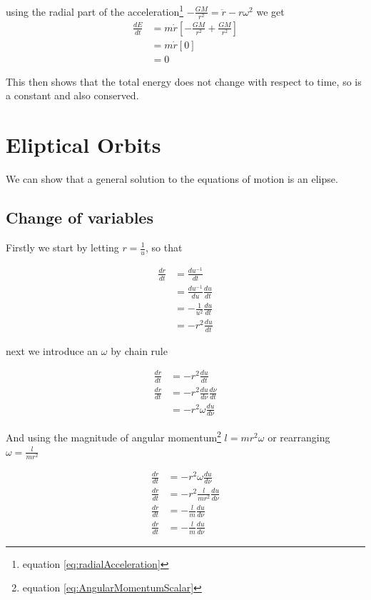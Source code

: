 using the radial part of the acceleration\footnote{equation \ref{eq:radialAcceleration}} $-\frac{GM}{r^2}= \ddot{r} -r \omega^2$ we get
\begin{align}
\frac{dE}{dt}&=m \dot{r}\left[-\frac{GM}{r^2}+\frac{GM}{r^2}\right] \nonumber \\
&=m \dot{r}\left[0\right] \nonumber \\
&=0
\end{align}

This then shows that the total energy does not change with respect to time, so is a constant and also conserved.

\section{Eliptical Orbits}
We can show that a general solution to the equations of motion is an elipse.

\subsection{Change of variables}
Firstly we start by letting $r=\frac{1}{u}$, so that

\begin{align}
\frac{dr}{dt} &= \frac{du^{-1}}{dt}\nonumber \\
&= \frac{du^{-1}}{du}\frac{du}{dt}\nonumber \\
&= -\frac{1}{u^2}\frac{du}{dt}\nonumber \\
&= -r^2\frac{du}{dt}
\end{align}

next we introduce an $\omega$ by chain rule

\begin{align}
\frac{dr}{dt}
&= -r^2\frac{du}{dt}\nonumber \\
\frac{dr}{dt} &= -r^2\frac{du}{d\nu}\frac{d\nu}{dt} \nonumber \\
&= -r^2\omega\frac{du}{d\nu} \nonumber
\end{align}

And using the magnitude of angular momentum\footnote{equation \ref{eq:AngularMomentumScalar}} $l=mr^2\omega$ or rearranging $\omega = \frac{l}{mr^2}$

\begin{align}
\frac{dr}{dt}&= -r^2\omega\frac{du}{d\nu} \nonumber \\
\frac{dr}{dt}&= -r^2\frac{l}{mr^2}\frac{du}{d\nu} \nonumber \\
\frac{dr}{dt}&= -\frac{l}{m}\frac{du}{d\nu} \nonumber \\
\frac{dr}{dt}&= -\frac{l}{m}\frac{du}{d\nu}
\end{align}


